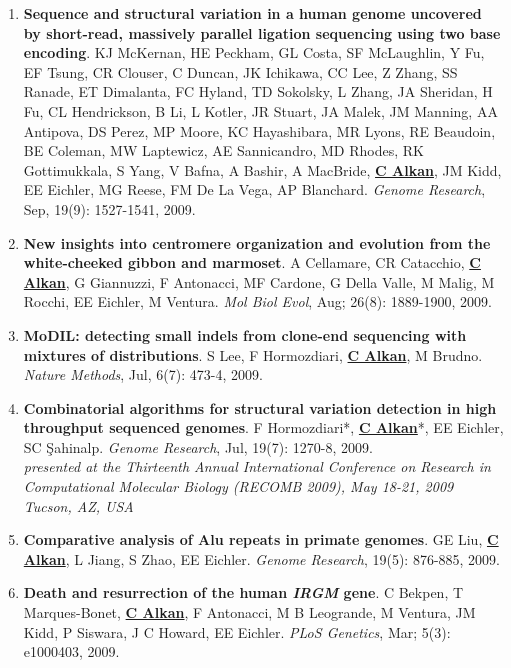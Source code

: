 \begin{enumerate}
\item
{\bf Sequence and structural variation in a human genome uncovered by short-read, massively parallel ligation sequencing using two base encoding}.
KJ McKernan, HE Peckham, GL Costa, SF McLaughlin, Y Fu, EF Tsung, CR Clouser, C Duncan, JK Ichikawa, CC Lee, Z Zhang, 
SS Ranade, ET Dimalanta,  FC Hyland, TD Sokolsky, L Zhang, JA Sheridan, H Fu, CL Hendrickson, B Li, L Kotler, JR Stuart, 
JA Malek, JM Manning, AA Antipova, DS Perez, MP Moore, KC Hayashibara, MR Lyons, RE Beaudoin, BE Coleman, MW Laptewicz, 
AE Sannicandro, MD Rhodes, RK Gottimukkala, S Yang, V Bafna, A Bashir, A MacBride, {\bf \underline{C Alkan}}, JM Kidd, EE Eichler, 
MG Reese, FM De La Vega, AP Blanchard. 
{\em Genome Research}, Sep, 19(9): 1527-1541, 2009.


\item
{\bf  New insights into centromere organization and evolution from the white-cheeked gibbon and marmoset}.
A Cellamare,    CR Catacchio,  {\bf \underline{C Alkan}}, G Giannuzzi, F Antonacci, MF Cardone, G Della Valle, M Malig, M Rocchi, EE Eichler, M Ventura.
{\em Mol Biol Evol}, Aug;  26(8): 1889-1900, 2009.

\item
{\bf MoDIL: detecting small indels from clone-end sequencing with mixtures of distributions}.
S Lee, F Hormozdiari, {\bf {\underline{C Alkan}}}, M Brudno.
{\em Nature Methods},  Jul, 6(7): 473-4, 2009.

\item
{\bf  Combinatorial algorithms for structural variation detection in high throughput sequenced genomes}.
F Hormozdiari*, {\bf {\underline{C Alkan}}}*, EE Eichler, SC \c{S}ahinalp. 
{\em Genome Research}, Jul, 19(7): 1270-8, 2009.\\
\hspace*{1cm} {\footnotesize {\it presented at the
 Thirteenth Annual International Conference on Research in Computational Molecular 
Biology (RECOMB 2009), May 18-21, 2009 Tucson, AZ, USA}}



\item

{\bf Comparative analysis of Alu repeats in primate genomes}.  GE Liu, {\bf {\underline{C Alkan}}}, L Jiang, S Zhao, EE Eichler. 
{\em Genome Research}, 19(5): 876-885, 2009.




\item
{\bf Death and resurrection of the human {\em IRGM} gene}. C Bekpen, T Marques-Bonet,
{\bf {\underline{C Alkan}}}, F Antonacci, M B Leogrande, M Ventura, JM Kidd, P Siswara, J C Howard, EE Eichler. {\em PLoS Genetics}, Mar;  5(3): e1000403, 2009.


\end{enumerate}
